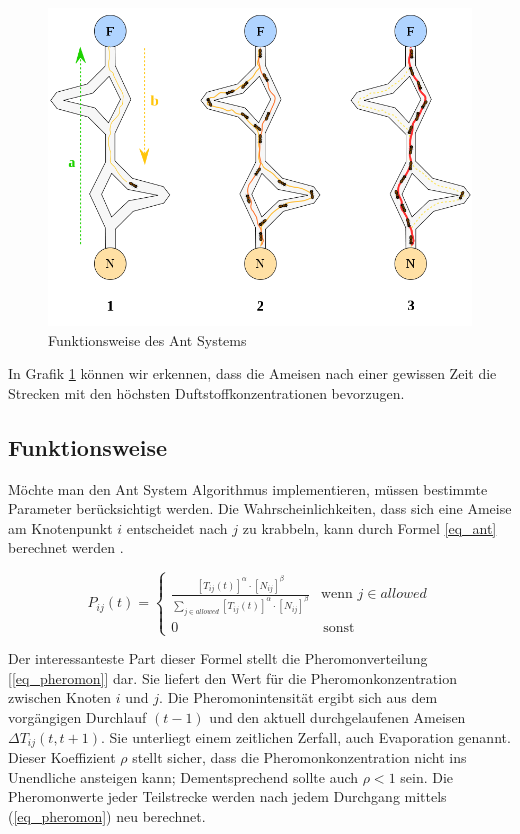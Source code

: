 \begin{figure}[h!]
    \centering
    \includegraphics[scale=0.45]{resources/swarm_ant_system.png}
    \caption{Funktionsweise des Ant Systems \cite{Wiki03}}
    \label{fig:swarm}
  \end{figure}

In Grafik \ref{fig:swarm} können wir erkennen, dass die Ameisen nach einer gewissen Zeit die Strecken mit den
höchsten Duftstoffkonzentrationen bevorzugen.

\subsection{Funktionsweise}
Möchte man den Ant System Algorithmus implementieren, müssen bestimmte Parameter berücksichtigt werden. Die
Wahrscheinlichkeiten, dass sich eine Ameise am Knotenpunkt $i$ entscheidet nach $j$ zu krabbeln, kann durch
Formel \ref{eq_ant} berechnet werden \cite{Blu03}. 

\begin{equation}
    \label{eq_ant}
    P_{ij}(t) = \begin{cases}
        \frac{[T_{ij}(t)]^\alpha \cdot [N_{ij}]^\beta}
        {\sum_{j \in {allowed}}^{} [T_{ij}(t)]^\alpha \cdot [N_{ij}]^\beta} & \text{wenn } j \in {allowed} \\
        0 & \, \text{sonst}
        \end{cases}
\end{equation}
\label{eq_ant1}

Der interessanteste Part dieser Formel stellt die Pheromonverteilung [\ref{eq_pheromon}] dar. Sie liefert den Wert
für die Pheromonkonzentration zwischen Knoten $i$ und $j$. Die Pheromonintensität ergibt sich
aus dem vorgängigen Durchlauf $(t-1)$ und den aktuell durchgelaufenen Ameisen $\Delta T_{ij}(t, t+1)$. Sie
unterliegt einem zeitlichen Zerfall, auch Evaporation genannt. Dieser Koeffizient $\rho$  stellt sicher, dass
die Pheromonkonzentration nicht ins Unendliche ansteigen kann; Dementsprechend sollte auch $\rho < 1$ sein.
Die Pheromonwerte jeder Teilstrecke werden nach jedem Durchgang mittels (\ref{eq_pheromon}) neu berechnet.

